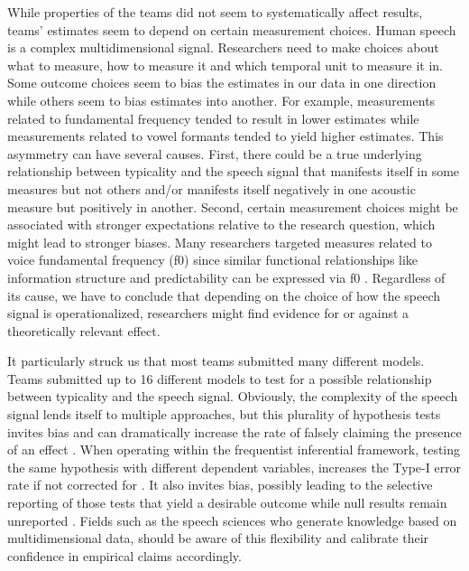 \documentclass[Review,times,sageh]{sagej}
\begin{document}
While properties of the teams did not seem to systematically affect results, teams' estimates seem to depend on certain measurement choices.
Human speech is a complex multidimensional signal.
Researchers need to make choices about what to measure, how to measure it and which temporal unit to measure it in.
Some outcome choices seem to bias the estimates in our data in one direction while others seem to bias estimates into another.
For example, measurements related to fundamental frequency tended to result in lower estimates while measurements related to vowel formants tended to yield higher estimates.
This asymmetry can have several causes.
First, there could be a true underlying relationship between typicality and the speech signal that manifests itself in some measures but not others and/or manifests itself negatively in one acoustic measure but positively in another.
Second, certain measurement choices might be associated with stronger expectations relative to the research question, which might lead to stronger biases.
Many researchers targeted measures related to voice fundamental frequency (f0) since similar functional relationships like information structure and predictability can be expressed via f0 \citep[e.g.][]{grice2017integrating, turnbull2017role}.
Regardless of its cause, we have to conclude that depending on the choice of how the speech signal is operationalized, researchers might find evidence for or against a theoretically relevant effect.

It particularly struck us that most teams submitted many different models.
Teams submitted up to 16 different models to test for a possible relationship between typicality and the speech signal.
Obviously, the complexity of the speech signal lends itself to multiple approaches, but this plurality of hypothesis tests invites bias and can dramatically increase the rate of falsely claiming the presence of an effect \citep{roettger2019researcher}.
When operating within the frequentist inferential framework, testing the same hypothesis with different dependent variables, increases the Type-I error rate if not corrected for \citep[Tukey 1953,][]{benjamini1995controlling}.
It also invites bias, possibly leading to the selective reporting of those tests that yield a desirable outcome \citep[\citet{john2012measuring}, \citet{simmons2011false}]{kerr1998harking} while null results remain unreported \citep[e.g.,][\citet{rosenthal1979file}]{sterling1959publication}.
Fields such as the speech sciences who generate knowledge based on multidimensional data, should be aware of this flexibility and calibrate their confidence in empirical claims accordingly.
\end{document}
